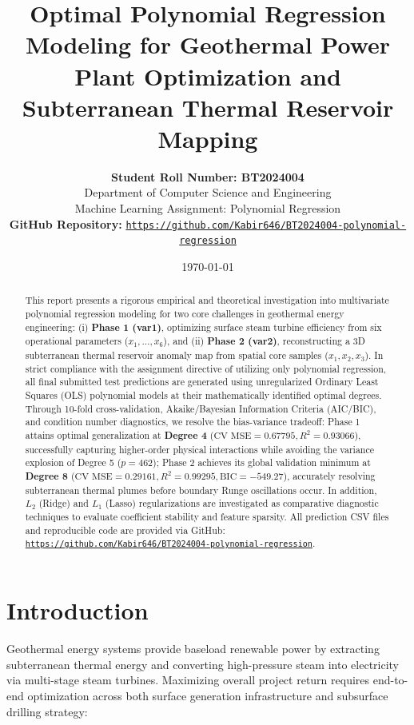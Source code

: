 \documentclass[10pt,twocolumn,a4paper]{article}
\title{\textbf{\Large Optimal Polynomial Regression Modeling for Geothermal Power Plant Optimization and Subterranean Thermal Reservoir Mapping}}
\author{
    \textbf{Student Roll Number: BT2024004} \\
    Department of Computer Science and Engineering \\
    Machine Learning Assignment: Polynomial Regression \\
    \textbf{GitHub Repository:} \href{https://github.com/Kabir646/BT2024004-polynomial-regression}{\texttt{https://github.com/Kabir646/BT2024004-polynomial-regression}}
}
\date{\today}
\begin{document}
\maketitle

\begin{abstract}
\noindent This report presents a rigorous empirical and theoretical investigation into multivariate polynomial regression modeling for two core challenges in geothermal energy engineering: (i) \textbf{Phase 1 (var1)}, optimizing surface steam turbine efficiency from six operational parameters ($x_1, \dots, x_6$), and (ii) \textbf{Phase 2 (var2)}, reconstructing a 3D subterranean thermal reservoir anomaly map from spatial core samples ($x_1, x_2, x_3$). In strict compliance with the assignment directive of utilizing only polynomial regression, all final submitted test predictions are generated using unregularized Ordinary Least Squares (OLS) polynomial models at their mathematically identified optimal degrees. Through 10-fold cross-validation, Akaike/Bayesian Information Criteria (AIC/BIC), and condition number diagnostics, we resolve the bias-variance tradeoff: Phase 1 attains optimal generalization at \textbf{Degree 4} ($\text{CV MSE} = 0.67795, R^2 = 0.93066$), successfully capturing higher-order physical interactions while avoiding the variance explosion of Degree 5 ($p = 462$); Phase 2 achieves its global validation minimum at \textbf{Degree 8} ($\text{CV MSE} = 0.29161, R^2 = 0.99295, \text{BIC} = -549.27$), accurately resolving subterranean thermal plumes before boundary Runge oscillations occur. In addition, $L_2$ (Ridge) and $L_1$ (Lasso) regularizations are investigated as comparative diagnostic techniques to evaluate coefficient stability and feature sparsity. All prediction CSV files and reproducible code are provided via GitHub: \href{https://github.com/Kabir646/BT2024004-polynomial-regression}{\texttt{https://github.com/Kabir646/BT2024004-polynomial-regression}}.
\end{abstract}

\section{Introduction}
Geothermal energy systems provide baseload renewable power by extracting subterranean thermal energy and converting high-pressure steam into electricity via multi-stage steam turbines. Maximizing overall project return requires end-to-end optimization across both surface generation infrastructure and subsurface drilling strategy:
\end{document}
